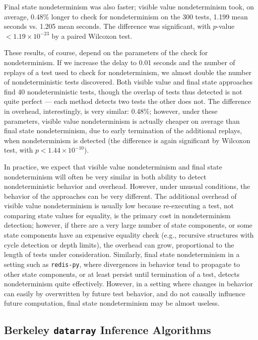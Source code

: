 Final state nondeterminism was also faster; visible value
nondeterminism took, on average, 0.48\% longer to check for
nondeterminism on the 300 tests, 1.199 mean seconds vs. 1.205 mean seconds.  The difference was significant, with
$p$-value $< 1.19 \times 10^{-23}$ by a paired Wilcoxon test.

These results, of course, depend on the parameters of the check for
nondeterminism.  If we increase the delay to 0.01 seconds and the
number of replays of a test used to check for nondeterminism, we
almost double the number of nondeterministic tests discovered.  Both
visible value and final state approaches find 40 nondeterministic
tests, though the overlap of tests thus detected is not quite perfect
--- each method detects two tests the other does not.  The difference
in overhead, interestingly, is very similar:  0.48\%; however, under
these parameters, visible value nondeterminism is actually cheaper on average
than final state nondeterminism, due to early termination of the
additional replays, when nondeterminism is detected (the difference is
again significant by Wilcoxon test, with $p < 1.44 \times 10^{-10}$).

In practice, we expect that visible value nondeterminism and final state
nondeterminism will often be very similar in both ability to detect
nondeterministic behavior and overhead.  However, under unusual
conditions, the behavior of the approaches can be very different.  The
additional overhead of visible value nondeterminism is usually low
because re-executing a test, not comparing state values for equality, is
the primary cost in nondeterminism detection; however, if there are a
very large number of state components, or some state components have
an expensive equality check (e.g., recursive structures with cycle
detection or depth limits), the overhead can grow, proportional to the
length of tests under consideration.  Similarly, final state
nondeterminism in a setting such as {\tt redis-py}, where divergences
in behavior tend to propagate to other state components, or at least
persist until termination of a test, detects nondeterminism quite
effectively.  However, in a setting where changes in behavior can
easily by overwritten by future test behavior, and do not causally
influence future computation, final state nondeterminism may be almost useless.

\subsection{Berkeley {\tt datarray} Inference Algorithms}


